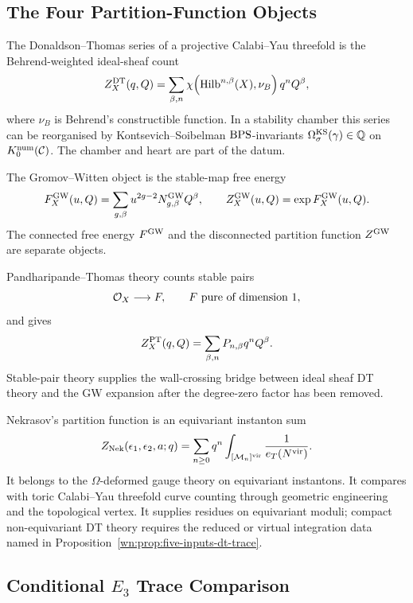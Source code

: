\subsection*{The Four Partition-Function Objects}
\label{subsec:dt-gw-pt-nekrasov-four-objects}

The Donaldson--Thomas series of a projective Calabi--Yau threefold is
the Behrend-weighted ideal-sheaf count
\[
  Z^{\mathrm{DT}}_X(q,Q)
  =
  \sum_{\beta,n}
  \chi\!\left(\mathrm{Hilb}^{n,\beta}(X),\nu_B\right)q^nQ^\beta ,
\]
where \(\nu_B\) is Behrend's constructible function.  In a stability
chamber this series can be reorganised by Kontsevich--Soibelman
\(\mathrm{BPS}\)-invariants
\(\Omega^{\mathrm{KS}}_\sigma(\gamma)\in\mathbb{Q}\) on
\(K^{\mathrm{num}}_0(\mathcal{C})\).  The chamber and heart are part of the
datum.

The Gromov--Witten object is the stable-map free energy
\[
  F^{\mathrm{GW}}_X(u,Q)=
  \sum_{g,\beta}u^{2g-2}N^{\mathrm{GW}}_{g,\beta}Q^\beta ,
  \qquad
  Z^{\mathrm{GW}}_X(u,Q)=\exp F^{\mathrm{GW}}_X(u,Q).
\]
The connected free energy \(F^{\mathrm{GW}}\) and the disconnected partition
function \(Z^{\mathrm{GW}}\) are separate objects.

Pandharipande--Thomas theory counts stable pairs
\[
  \mathcal{O}_X \longrightarrow F,
  \qquad
  F \text{ pure of dimension }1,
\]
and gives
\[
  Z^{\mathrm{PT}}_X(q,Q)
  =
  \sum_{\beta,n}P_{n,\beta}q^nQ^\beta .
\]
Stable-pair theory supplies the wall-crossing bridge between ideal
sheaf DT theory and the GW expansion after the degree-zero factor has
been removed.

Nekrasov's partition function is an equivariant instanton sum
\[
  Z_{\mathrm{Nek}}(\epsilon_1,\epsilon_2,a;q)
  =
  \sum_{n\geq0}q^n
  \int_{[\mathcal{M}_n]^{\mathrm{vir}}}
  \frac{1}{e_T(N^{\mathrm{vir}})} .
\]
It belongs to the \(\Omega\)-deformed gauge theory on equivariant
instantons.  It compares with toric Calabi--Yau threefold curve
counting through geometric engineering and the topological vertex.
It supplies residues on equivariant moduli; compact non-equivariant DT
theory requires the reduced or virtual integration data named in
Proposition~\ref{wn:prop:five-inputs-dt-trace}.

\subsection*{Conditional \texorpdfstring{$E_3$}{E3} Trace Comparison}
\label{subsec:conditional-e3-trace}

